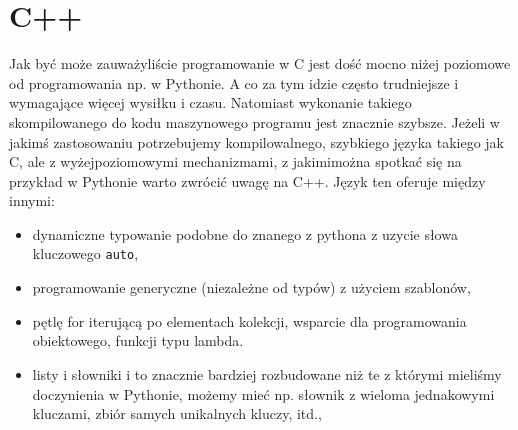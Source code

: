 % 
% 
% 
% 

\section{C++}

Jak być może zauważyliście programowanie w C jest dość mocno niżej poziomowe od programowania np. w Pythonie.
A co za tym idzie często trudniejsze i wymagające więcej wysiłku i czasu.
Natomiast wykonanie takiego skompilowanego do kodu maszynowego programu jest znacznie szybsze.
Jeżeli w jakimś zastosowaniu potrzebujemy kompilowalnego, szybkiego języka takiego jak C,
	ale z wyżejpoziomowymi mechanizmami, z jakimimożna spotkać się na przykład w Pythonie warto zwrócić uwagę na C++.
Język ten oferuje między innymi:
\begin{itemize}
	\item dynamiczne typowanie podobne do znanego z pythona z uzycie słowa kluczowego \Verb$auto$,
	\item programowanie generyczne (niezależne od typów) z użyciem szablonów,
	\item pętlę for iterującą po elementach kolekcji, wsparcie dla programowania obiektowego, funkcji typu lambda.
	\item listy i słowniki i to znacznie bardziej rozbudowane niż te z którymi mieliśmy doczynienia w Pythonie, 
		możemy mieć np. słownik z wieloma jednakowymi kluczami, zbiór samych unikalnych kluczy, itd.,
\end{itemize}

